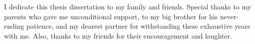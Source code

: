 I dedicate this thesis dissertation to my family and friends. Special thanks to my parents who gave me unconditional support, to my big brother for his never-ending patience, and my dearest partner for withstanding these exhaustive years with me. Also, thanks to my friends for their encouragement and laughter.